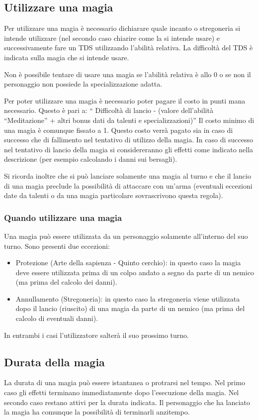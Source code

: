 \documentclass[../manuale_main.tex]{subfiles}
\begin{document}
\subsection{Utilizzare una magia}

Per utilizzare una magia è necessario dichiarare quale incanto o stregoneria si intende utilizzare (nel secondo caso chiarire come la si intende usare) e successivamente fare un TDS utilizzando l'abilità relativa. La difficoltà del TDS è indicata sulla magia che si intende usare.

Non è possibile tentare di usare una magia se l'abilità relativa è allo 0 o se non il personaggio non possiede la specializzazione adatta.

Per poter utilizzare una magia è necessario poter pagare il costo in punti mana necessario.
Questo è pari a: “ Difficoltà di lancio - (valore dell'abilità “Meditazione” + altri bonus dati da talenti e specializzazioni)”
Il costo minimo di una magia è comunque fissato a 1.
Questo costo verrà pagato sia in caso di successo che di fallimento nel tentativo di utilizzo della magia.
In caso di successo nel tentativo di lancio della magia si considereranno gli effetti come indicato nella descrizione (per esempio calcolando i danni sui bersagli).

Si ricorda inoltre che si può lanciare solamente una magia al turno e che il lancio di una magia preclude la possibilità di attaccare con un'arma (eventuali eccezioni date da talenti o da una magia particolare sovrascrivono questa regola).

\subsubsection{Quando utilizzare una magia}
Una magia può essere utilizzata da un personaggio solamente all'interno del suo turno.
Sono presenti due eccezioni:
\begin{itemize}
\item Protezione (Arte della sapienza - Quinto cerchio): in questo caso la magia deve essere utilizzata prima di un colpo andato a segno da parte di un nemico (ma prima del calcolo dei danni).
\item Annullamento (Stregoneria): in questo caso la stregoneria viene utilizzata dopo il lancio (riuscito) di una magia da parte di un nemico (ma prima del calcolo di eventuali danni).
\end{itemize}
In entrambi i casi l'utilizzatore salterà il suo prossimo turno.

\subsection{Durata della magia}
La durata di una magia può essere istantanea o protrarsi nel tempo.
Nel primo caso gli effetti terminano immediatamente dopo l'esecuzione della magia.
Nel secondo caso restano attivi per la durata indicata. Il personaggio che ha lanciato la magia ha comunque la possibilità di terminarli anzitempo.
\end{document}
